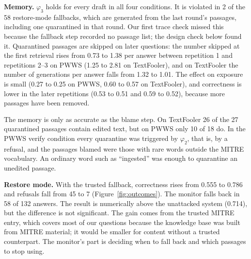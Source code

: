 \documentclass[10pt,journal,compsoc]{IEEEtran}
\begin{document}
\textbf{Memory.} $\varphi_3$ holds for every draft in all four conditions. It is violated in 2 of the 58 restore-mode fallbacks, which are generated from the last round's passages, including one quarantined in that round. Our first trace check missed this because the fallback step recorded no passage list; the design check below found it. Quarantined passages are skipped on later questions: the number skipped at the first retrieval rises from 0.73 to 1.38 per answer between repetition 1 and repetitions 2--3 on PWWS (1.25 to 2.81 on TextFooler), and on TextFooler the number of generations per answer falls from 1.32 to 1.01. The effect on exposure is small (0.27 to 0.25 on PWWS, 0.60 to 0.57 on TextFooler), and correctness is lower in the later repetitions (0.53 to 0.51 and 0.59 to 0.52), because more passages have been removed.

The memory is only as accurate as the blame step. On TextFooler 26 of the 27 quarantined passages contain edited text, but on PWWS only 10 of 18 do. In the PWWS verify condition every quarantine was triggered by $\varphi_2$, that is, by a refusal, and the passages blamed were those with rare words outside the MITRE vocabulary. An ordinary word such as ``ingested'' was enough to quarantine an unedited passage.

\textbf{Restore mode.} With the trusted fallback, correctness rises from 0.555 to 0.786 and refusals fall from 45 to 7 (Figure~\ref{fig:outcomes}). The monitor falls back in 58 of 132 answers. The result is numerically above the unattacked system (0.714), but the difference is not significant. The gain comes from the trusted MITRE entry, which covers most of our questions because the knowledge base was built from MITRE material; it would be smaller for content without a trusted counterpart. The monitor's part is deciding when to fall back and which passages to stop using.
\end{document}
